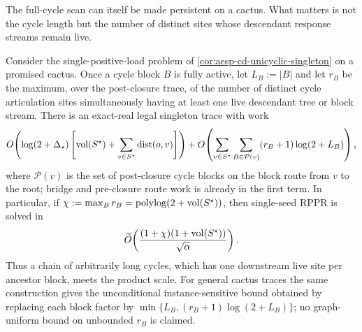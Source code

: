 The full-cycle scan can itself be made persistent on a cactus.  What matters
is not the cycle length but the number of distinct sites whose descendant
response streams remain live.

\begin{corollary}
\label{cor:aesp-cd-cactus-live-sites}
Consider the single-positive-load problem of
\cref{cor:aesp-cd-unicyclic-singleton} on a promised cactus.  Once a cycle
block $B$ is fully active, let $L_B:=|B|$ and let $r_B$ be the maximum, over
the post-closure trace, of the number of distinct cycle articulation sites
simultaneously having at least one live descendant tree or block stream.
There is an exact-real legal singleton trace with work
\begin{equation}
 O\!\left(\log(2+\Delta_\star)\left[
   \operatorname{vol}(S^\star)+\sum_{v\in S^\star}\operatorname{dist}(o,v)
 \right]\right)+
 O\!\left(
  \sum_{v\in S^\star}
  \sum_{B\in\mathcal P(v)}(r_B+1)\log(2+L_B)
 \right),
 \label{eq:aesp-cd-cactus-live-sites-work}
\end{equation}
where $\mathcal P(v)$ is the set of post-closure cycle blocks on the block
route from $v$ to the root; bridge and pre-closure route work is already in
the first term.  In particular,
if $\chi:=\max_B r_B=\operatorname{polylog}(2+\operatorname{vol}(S^\star))$, then single-seed
RPPR is solved in
\begin{equation*}
 \widetilde O\!\left(
  \frac{(1+\chi)(1+\operatorname{vol}(S^\star))}{\sqrt\alpha}
 \right).
\end{equation*}
Thus a chain of arbitrarily long cycles, which has one downstream live site
per ancestor block, meets the product scale.  For general cactus traces the
same construction gives the unconditional instance-sensitive bound obtained
by replacing each block factor by
$\min\{L_B,(r_B+1)\log(2+L_B)\}$; no
graph-uniform bound on unbounded $r_B$ is claimed.
\end{corollary}

